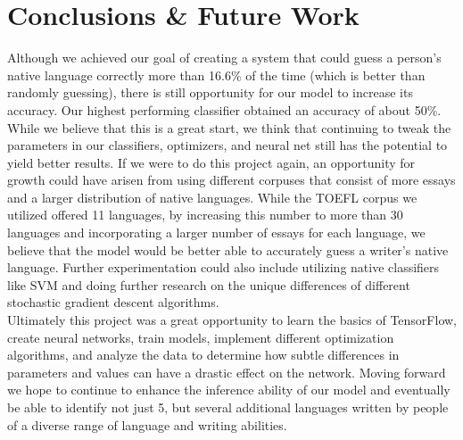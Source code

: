 \documentclass[11pt,a4paper]{article}
\newcommand\tab[1][1cm]{\hspace*{#1}}
\begin{document}
\section{Conclusions \& Future Work}
\tab Although we achieved our goal of creating a system that could guess a person’s native language correctly more than 16.6\% of the time (which is better than randomly guessing), there is still opportunity for our model to increase its accuracy. Our highest performing classifier obtained an accuracy of about 50\%. While we believe that this is a great start, we think that continuing to tweak the parameters in our classifiers, optimizers, and neural net still has the potential to yield better results. If we were to do this project again, an opportunity for growth could have arisen from using different corpuses that consist of more essays and a larger distribution of native languages. While the TOEFL corpus we utilized offered 11 languages, by increasing this number to more than 30 languages and incorporating a larger number of essays for each language, we believe that the model would be better able to accurately guess a writer’s native language. Further experimentation could also include utilizing native classifiers like SVM and doing further research on the unique differences of different stochastic gradient descent algorithms.\\
\tab Ultimately this project was a great opportunity to learn the basics of TensorFlow, create neural networks, train models, implement different optimization algorithms, and analyze the data to determine how subtle differences in parameters and values can have a drastic effect on the network. Moving forward we hope to continue to enhance the inference ability of our model and eventually be able to identify not just 5, but several additional languages written by people of a diverse range of language and writing abilities.

%
%
%
\end{document}
